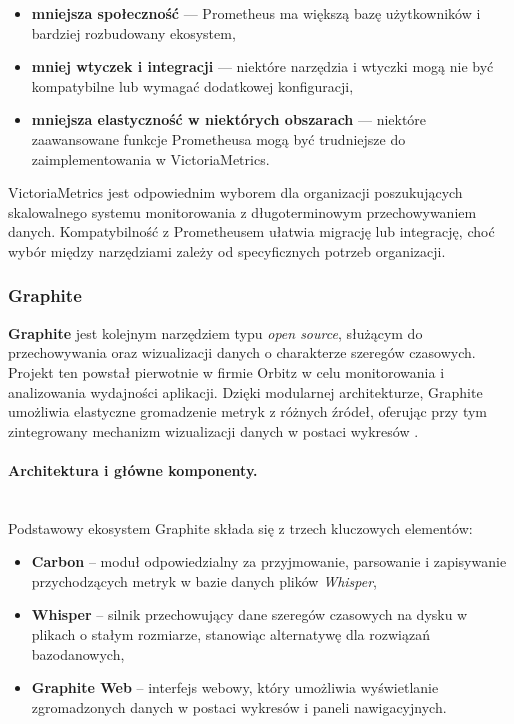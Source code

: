 \documentclass{article}
\begin{document}
\begin{itemize}
    \item \textbf{mniejsza społeczność} — Prometheus ma większą bazę użytkowników i bardziej rozbudowany ekosystem,
    \item \textbf{mniej wtyczek i integracji} — niektóre narzędzia i wtyczki mogą nie być kompatybilne lub wymagać dodatkowej konfiguracji,
    \item \textbf{mniejsza elastyczność w niektórych obszarach} — niektóre zaawansowane funkcje Prometheusa mogą być trudniejsze do zaimplementowania w VictoriaMetrics.
\end{itemize}


VictoriaMetrics jest odpowiednim wyborem dla organizacji poszukujących skalowalnego systemu monitorowania z długoterminowym przechowywaniem danych. Kompatybilność z Prometheusem ułatwia migrację lub integrację, choć wybór między narzędziami zależy od specyficznych potrzeb organizacji.

\subsubsection{Graphite}
\label{subsubsec:graphite}

\textbf{Graphite} jest kolejnym narzędziem typu \emph{open source}, służącym do przechowywania oraz wizualizacji danych o charakterze szeregów czasowych. Projekt ten powstał pierwotnie w firmie Orbitz w celu monitorowania i analizowania wydajności aplikacji. Dzięki modularnej architekturze, Graphite umożliwia elastyczne gromadzenie metryk z różnych źródeł, oferując przy tym zintegrowany mechanizm wizualizacji danych w postaci wykresów \cite{GraphiteDocs}.

\paragraph{Architektura i główne komponenty.}\mbox{}\\
Podstawowy ekosystem Graphite składa się z trzech kluczowych elementów:
\begin{itemize}
    \item \textbf{Carbon} -- moduł odpowiedzialny za przyjmowanie, parsowanie i zapisywanie przychodzących metryk w bazie danych plików \emph{Whisper},
    \item \textbf{Whisper} -- silnik przechowujący dane szeregów czasowych na dysku w plikach o stałym rozmiarze, stanowiąc alternatywę dla rozwiązań bazodanowych,
    \item \textbf{Graphite Web} -- interfejs webowy, który umożliwia wyświetlanie zgromadzonych danych w postaci wykresów i paneli nawigacyjnych.
\end{itemize}
\end{document}
